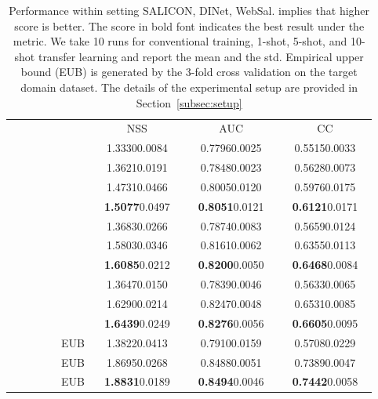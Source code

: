 \documentclass[runningheads]{llncs}
\begin{document}
\newpage

\begin{table}[!t]
	\centering
	\caption{Performance within setting SALICON, DINet, WebSal.  implies that higher score is better. The score in bold font indicates the best result under the metric. We take 10 runs for conventional training, 1-shot, 5-shot, and 10-shot transfer learning and report the mean and the std. Empirical upper bound (EUB) is generated by the 3-fold cross validation on the target domain dataset. The details of the experimental setup are provided in Section~\ref{subsec:setup}}
	\footnotesize
\begin{tabular}{lcccc}
		\toprule
		& & NSS & AUC & CC \\
		\cmidrule(lr){3-3} \cmidrule(lr){4-4} \cmidrule(lr){5-5}
		 &  & ~~1.33300.0084~~ & ~~0.77960.0025~~ & ~~0.55150.0033~~  \\ \midrule
~~~~~~~ &  & 1.36210.0191 & 0.78480.0023 & 0.56280.0073 \\ 
		 &  & 1.47310.0466 & 0.80050.0120 & 0.59760.0175 \\
		 &  & \textbf{1.5077}0.0497 & \textbf{0.8051}0.0121 & \textbf{0.6121}0.0171 \\ \midrule
		
 &  & 1.36830.0266 & 0.78740.0083 & 0.56590.0124  \\
		 &  & 1.58030.0346 & 0.81610.0062 & 0.63550.0113  \\
		 &  & \textbf{1.6085}0.0212 & \textbf{0.8200}0.0050 & \textbf{0.6468}0.0084 \\ \midrule
		
 &  & 1.36470.0150 & 0.78390.0046 & 0.56330.0065  \\ 
		 &  & 1.62900.0214 & 0.82470.0048 & 0.65310.0085  \\
		 &  & \textbf{1.6439}0.0249 & \textbf{0.8276}0.0056 & \textbf{0.6605}0.0095 \\ \midrule
		
 & EUB & 1.38220.0413 & 0.79100.0159 & 0.57080.0229 \\
		 & EUB & 1.86950.0268 & 0.84880.0051 & 0.73890.0047 \\
		 & EUB & \textbf{1.8831}0.0189 & \textbf{0.8494}0.0046 & \textbf{0.7442}0.0058 \\
		\bottomrule	
	\end{tabular}
	\label{tbl:s_d_w_sup}
\end{table}
\end{document}
